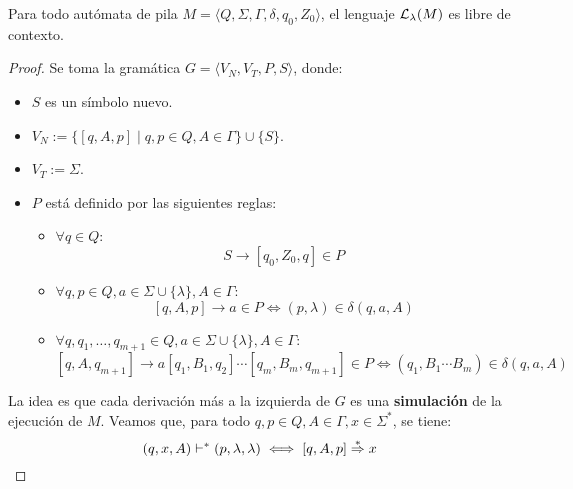 \begin{theorem*}
    Para todo autómata de pila $M = \langle Q, \Sigma, \Gamma, \delta, q_0, Z_0 \rangle$, el lenguaje $\mathcal{L}_\lambda(M)$ es libre de contexto.
\end{theorem*}
\begin{proof}
    Se toma la gramática $G = \langle V_N, V_T, P, S \rangle$, donde:
    \begin{itemize}
        \item $S$ es un símbolo nuevo.
        \item $V_N := \{[q, A, p] \mid q, p \in Q, A \in \Gamma\} \cup \{S\}$.
        \item $V_T := \Sigma$.
        \item $P$ está definido por las siguientes reglas:
        \begin{itemize}
            \item $\forall q \in Q$:
            $$
                S \to [q_0, Z_0, q] \in P
            $$
            \item $\forall q, p \in Q, a \in \Sigma \cup \{\lambda\}, A \in \Gamma$:
            $$
                [q, A, p] \to a \in P \iff (p, \lambda) \in \delta(q, a, A)
            $$
            \item $\forall q, q_1, \dots, q_{m + 1} \in Q, a \in \Sigma \cup \{\lambda\}, A \in \Gamma$:
            $$
                [q, A, q_{m+1}] \to a[q_1, B_1, q_2] \cdots [q_m, B_m, q_{m + 1}] \in P \iff (q_1, B_1 \cdots B_m) \in \delta(q, a, A)
            $$
        \end{itemize}
    \end{itemize}

    La idea es que cada derivación más a la izquierda de $G$ es una \textbf{simulación} de la ejecución de $M$. Veamos que, para todo $q, p \in Q, A \in \Gamma, x \in \Sigma^*$, se tiene:
    $$
        (q, x, A) \vdash^* (p, \lambda, \lambda) \iff [q, A, p] \overset{*}{\Rightarrow} x
    $$


\end{proof}
